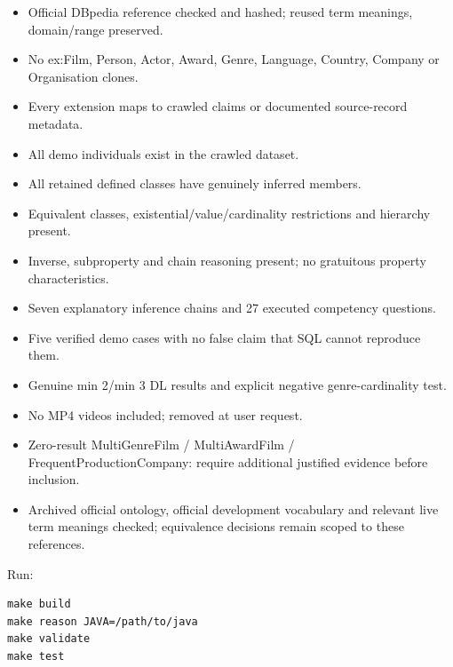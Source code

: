 \documentclass[
  11pt,
]{article}
\providecommand{\tightlist}{%
  \setlength{\itemsep}{0pt}\setlength{\parskip}{0pt}}
\begin{document}
\begin{itemize}
\tightlist
\item[$\boxtimes$]
  Official DBpedia reference checked and hashed; reused term meanings,
  domain/range preserved.
\item[$\boxtimes$]
  No ex:Film, Person, Actor, Award, Genre, Language, Country, Company or
  Organisation clones.
\item[$\boxtimes$]
  Every extension maps to crawled claims or documented
  source-\allowbreak{}r\allowbreak{}ecord metadata.
\item[$\boxtimes$]
  All demo individuals exist in the crawled dataset.
\item[$\boxtimes$]
  All retained defined classes have genuinely inferred members.
\item[$\boxtimes$]
  Equivalent classes,
  existent\allowbreak{}ial/\allowbreak{}valu\allowbreak{}e/\allowbreak{}cardin\allowbreak{}ality
  restrictions and hierarchy present.
\item[$\boxtimes$]
  Inverse, subproperty and chain reasoning present; no gratuitous
  property characte\allowbreak{}ristics.\allowbreak{}
\item[$\boxtimes$]
  Seven explanatory inference chains and 27 executed competency
  questions.
\item[$\boxtimes$]
  Five verified demo cases with no false claim that SQL cannot reproduce
  them.
\item[$\boxtimes$]
  Genuine min 2/min 3 DL results and explicit negative
  genre-\allowbreak{}ca\allowbreak{}rdinalit\allowbreak{}y test.
\item[$\boxtimes$]
  No MP4 videos included; removed at user request.
\item[$\square$]
  Zero-result Multi\allowbreak{}Gen\allowbreak{}re\allowbreak{}Film /
  Multi\allowbreak{}Awa\allowbreak{}rd\allowbreak{}Film /
  Frequent\allowbreak{}\allowbreak{}Producti\allowbreak{}on\allowbreak{}Compan\allowbreak{}y:\allowbreak{}
  require additional justified evidence before inclusion.
\item[$\boxtimes$]
  Archived official ontology, official development vocabulary and
  relevant live term meanings checked; equivalence decisions remain
  scoped to these references.
\end{itemize}

Run:

\begin{verbatim}
make build
make reason JAVA=/path/to/java
make validate
make test
\end{verbatim}
\end{document}
